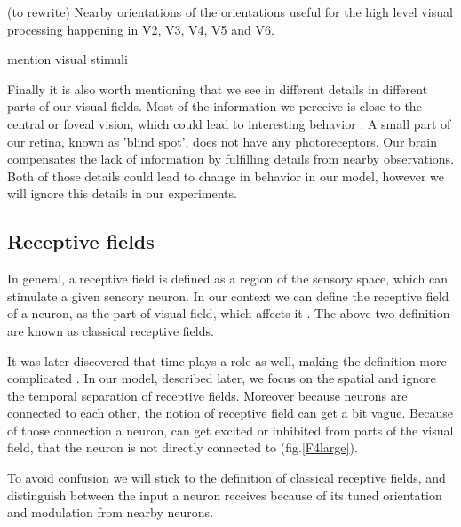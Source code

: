 (to rewrite)
Nearby orientations of the orientations useful for the high level visual processing happening in V2, V3, V4, V5 and V6. 

mention visual stimuli

Finally it is also worth mentioning that we see in different details in different parts of our visual fields. Most of the information we perceive is close to the central or foveal vision, which could lead to interesting behavior \cite{knight2008drastically}. A small part of our retina, known as 'blind spot', does not have any photoreceptors. Our brain compensates the lack of information by fulfilling details from nearby observations. Both of those details could lead to change in behavior in our model, however we will ignore this details in our experiments.


\subsection{Receptive fields}

In general, a receptive field is defined as a region of the sensory space, which can stimulate a given sensory neuron. In our context we can define the receptive field of a neuron, as the part of visual field, which affects it \cite{Hartline700}. The above two definition are known as classical receptive fields.

It was later discovered that time plays a role as well, making the definition more complicated \cite{deangelis1995receptive}. In our model, described later, we focus on the spatial and ignore the temporal separation of receptive fields. Moreover because neurons are connected to each other, the notion of receptive field can get a bit vague. Because of those connection a neuron, can get excited or inhibited from parts of the visual field, that the neuron is not directly connected to (fig.\ref{F4large}).

To avoid confusion we will stick to the definition of classical receptive fields, and distinguish between the input a neuron receives because of its tuned orientation and modulation from nearby neurons.

